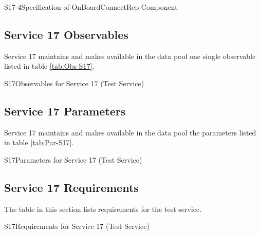 \documentclass[a4paper,10pt]{article}
\newenvironment{cr_req}[2]
{
\begin{longtable}{|l|p{11.8cm}|}
\caption{#2}\label{tab:Req-#1} \\
\hline
\rowcolor{light-gray}
\textbf{Req. ID} & \textbf{Requirement Text}\\
\hline\hline
\endfirsthead
\rowcolor{light-gray}
\textbf{Req. ID} & \textbf{Requirement Text}\\
\hline\hline
\endhead
\DTLforeach*[\DTLiseq{\cat}{#1}]{dbReq}{\cat=Category,\type=Type,\id=Id,\reqText=Text}
{\DTLiffirstrow{}{\\\hline}P-\cat-\id/\type & \textit{\reqText}}\\\hline
}
{\end{longtable}}
\newenvironment{cr_rep}[2]
{
\begin{longtable}{|c|p{10cm}|}
\caption{#2} \label{tab:CR-#1}\\
\hline
\rowcolor{light-gray}
\DTLforeach*{dbRep}{\att=Attribute,\attValue=#1}
{\DTLiffirstrow{}{\\\hline}\att & \attValue}\\\hline
}
{\end{longtable}}
\newenvironment{cr_obs}[2]
{
\begin{longtable}{|l|p{9.5cm}|}
\caption{#2}\label{tab:Obs-#1} \\
\hline
\rowcolor{light-gray}
\textbf{Name} & \textbf{Description}\\
\hline\hline
\endfirsthead
\rowcolor{light-gray}
\textbf{Name} & \textbf{Description}\\
\hline\hline
\endhead
\DTLforeach*[\DTLiseq{\cat}{#1}]{dbObs}{\cat=Category,\name=Name,\desc=Desc}
{\DTLiffirstrow{}{\\\hline}\texttt{\name} & \desc}\\\hline
}
{\end{longtable}}
\newenvironment{cr_par}[2]
{
\begin{longtable}{|l|p{9.5cm}|}
\caption{#2}\label{tab:Par-#1} \\
\hline
\rowcolor{light-gray}
\textbf{Name} & \textbf{Description}\\
\hline\hline
\endfirsthead
\rowcolor{light-gray}
\textbf{Name} & \textbf{Description}\\
\hline\hline
\endhead
\DTLforeach*[\DTLiseq{\cat}{#1}]{dbPar}{\cat=Category,\name=Name,\desc=Desc}
{\DTLiffirstrow{}{\\\hline}\texttt{\name} & \desc}\\\hline
}
{\end{longtable}}
\begin{document}
\begin{cr_rep}{S17-4}{Specification of OnBoardConnectRep Component}
\end{cr_rep}



\subsection{Service 17 Observables}\label{sec:serv17Obs}
Service 17 maintains and makes available in the data pool one single observable listed in table \ref{tab:Obs-S17}.

\begin{cr_obs}{S17}{Observables for Service 17 (Test Service)}
\end{cr_obs}

\newpage
\subsection{Service 17 Parameters}\label{sec:serv17Par}
Service 17 maintains and makes available in the data pool the parameters listed in table \ref{tab:Par-S17}.

\begin{cr_par}{S17}{Parameters for Service 17 (Test Service)}
\end{cr_par}


\subsection{Service 17 Requirements}
The table in this section lists requirements for the test service.

\begin{cr_req}{S17}{Requirements for Service 17 (Test Service)}
\end{cr_req}
\end{document}
